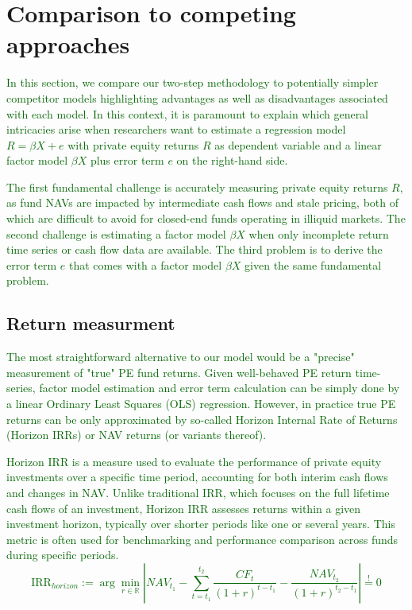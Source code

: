 \clearpage


\section{Comparison to competing approaches}
\label{sec:comparison}

\textcolor{darkgreen}{
	In this section, we compare our two-step methodology to potentially simpler competitor models highlighting advantages as well as disadvantages associated with each model.
	In this context, it is paramount to explain which general intricacies arise when researchers want to estimate a regression model $R = \beta X + e$ with private equity returns $R$ as dependent variable and a linear factor model $\beta X$ plus error term $e$ on the right-hand side.
}

\textcolor{darkgreen}{
	The first fundamental challenge is accurately measuring private equity returns $R$, as fund NAVs are impacted by intermediate cash flows and stale pricing, both of which are difficult to avoid for closed-end funds operating in illiquid markets. 
	The second challenge is estimating a factor model $\beta X$ when only incomplete return time series or cash flow data are available.
	The third problem is to derive the error term $e$ that comes with a factor model $\beta X$ given the same fundamental problem.
}

\subsection{Return measurment}

\textcolor{darkgreen}{
	The most straightforward alternative to our model would be a "precise" measurement of "true" PE fund returns.
	Given well-behaved PE return time-series, factor model estimation and error term calculation can be simply done by a linear Ordinary Least Squares (OLS) regression.
	However, in practice true PE returns can be only approximated by so-called Horizon Internal Rate of Returns (Horizon IRRs) or NAV returns (or variants thereof).
}

\textcolor{darkgreen}{
	Horizon IRR is a measure used to evaluate the performance of private equity investments over a specific time period, accounting for both interim cash flows and changes in NAV.
	Unlike traditional IRR, which focuses on the full lifetime cash flows of an investment, Horizon IRR assesses returns within a given investment horizon, typically over shorter periods like one or several years. 
	This metric is often used for benchmarking and performance comparison across funds during specific periods.
	\[
	\mathrm{IRR}_{horizon} := \arg \min_{r \in \mathbb{R}} 
	\left| 
	{NAV}_{t_1} -
	\sum_{t=t_1}^{t_2} \frac{{CF}_t}{(1 + r)^{t-t_1}} 
	- \frac{{NAV}_{t_2}}{(1 + r)^{t_2-t_1}}
	\right|
	\stackrel{!}{=} 0
	\]
}

